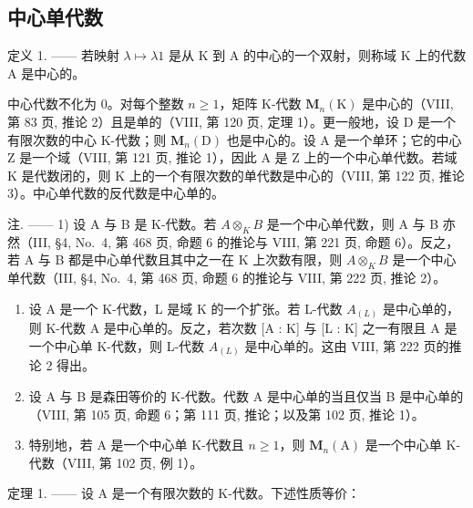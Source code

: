 \subsection{中心单代数}

定义 1. —— 若映射 \(\lambda\mapsto\lambda1\) 是从 K 到 A 的中心的一个双射，则称域 K 上的代数 A 是中心的。

中心代数不化为 0。对每个整数 \(n \geqslant 1\)，矩阵 K-代数 \(\mathbf{M}_{n}(\mathrm{K})\) 是中心的（VIII, 第 83 页, 推论 2）且是单的（VIII, 第 120 页, 定理 1）。更一般地，设 D 是一个有限次数的中心 K-代数；则 \(\mathbf{M}_{n}(\mathrm{D})\) 也是中心的。设 A 是一个单环；它的中心 Z 是一个域（VIII, 第 121 页, 推论 1），因此 A 是 Z 上的一个中心单代数。若域 K 是代数闭的，则 K 上的一个有限次数的单代数是中心的（VIII, 第 122 页, 推论 3）。中心单代数的反代数是中心单的。

注. —— 1) 设 A 与 B 是 K-代数。若 \(A \otimes_{K} B\) 是一个中心单代数，则 A 与 B 亦然（III, §4, No.~4, 第 468 页, 命题 6 的推论与 VIII, 第 221 页, 命题 6）。反之，若 A 与 B 都是中心单代数且其中之一在 K 上次数有限，则 \(A \otimes_{K} B\) 是一个中心单代数（III, §4, No.~4, 第 468 页, 命题 6 的推论与 VIII, 第 222 页, 推论 2）。

\begin{enumerate}
\def\labelenumi{\arabic{enumi})}
\setcounter{enumi}{1}
\item
  设 A 是一个 K-代数，L 是域 K 的一个扩张。若 L-代数 \(A_{(L)}\) 是中心单的，则 K-代数 A 是中心单的。反之，若次数 {[}A : K{]} 与 {[}L : K{]} 之一有限且 A 是一个中心单 K-代数，则 L-代数 \(A_{(L)}\) 是中心单的。这由 VIII, 第 222 页的推论 2 得出。
\item
  设 A 与 B 是森田等价的 K-代数。代数 A 是中心单的当且仅当 B 是中心单的（VIII, 第 105 页, 命题 6；第 111 页, 推论；以及第 102 页, 推论 1）。
\item
  特别地，若 A 是一个中心单 K-代数且 \(n \geqslant 1\)，则 \(\mathbf{M}_{n}(\mathrm{A})\) 是一个中心单 K-代数（VIII, 第 102 页, 例 1）。
\end{enumerate}

定理 1. —— 设 A 是一个有限次数的 K-代数。下述性质等价：

